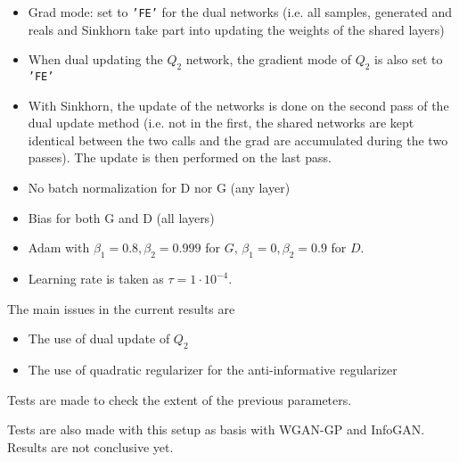 \documentclass[11pt,a4paper]{article}
\begin{document}
\begin{itemize}
    \item
        Grad mode: set to \texttt{'FE'} for the dual networks (i.e. all samples, generated
        and reals and Sinkhorn take part into updating the weights of the
        shared layers)

    \item
        When dual updating the $Q_2$ network, the gradient mode of $Q_2$ is also set to \texttt{'FE'}
    \item
        With Sinkhorn, the update of the networks is done on the second pass of
        the dual update method (i.e. not in the first, the shared networks are
        kept identical between the two calls and the grad are accumulated
        during the two passes). The update is then performed on the last pass.
    \item
        No batch normalization for D nor G (any layer)
    \item
        Bias for both G and D (all layers)
    \item
        Adam with $\beta_1 = 0.8, \beta_2 = 0.999$ for $G$, $\beta_1 = 0, \beta_2 = 0.9$ for $D$.
    \item
        Learning rate is taken as $\tau = 1 \cdot 10 ^{-4}$.
\end{itemize}

The main issues in the current results are
\begin{itemize}
    \item
        The use of dual update of $Q_2$
    \item
        The use of quadratic regularizer for the anti-informative regularizer
\end{itemize}

Tests are made to check the extent of the previous parameters.

Tests are also made with this setup as basis with WGAN-GP and InfoGAN. Results are not conclusive yet.

\printbibliography{}
\end{document}
